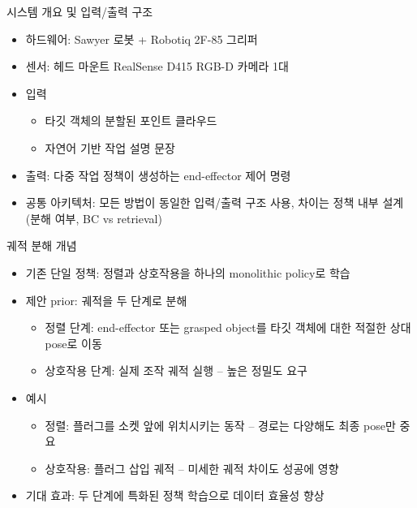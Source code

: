 \documentclass[aspectratio=169]{beamer}
\begin{document}
\begin{frame}{시스템 개요 및 입력/출력 구조}
  \small
  \begin{itemize}
    \item 하드웨어: Sawyer 로봇 + Robotiq 2F-85 그리퍼
    \item 센서: 헤드 마운트 RealSense D415 RGB-D 카메라 1대
    \item 입력
    \begin{itemize}
      \item 타깃 객체의 분할된 포인트 클라우드
      \item 자연어 기반 작업 설명 문장
    \end{itemize}
    \item 출력: 다중 작업 정책이 생성하는 end-effector 제어 명령
    \item 공통 아키텍처: 모든 방법이 동일한 입력/출력 구조 사용, 차이는 정책 내부 설계(분해 여부, BC vs retrieval)
  \end{itemize}
\end{frame}

\begin{frame}{궤적 분해 개념}
  \small
  \begin{itemize}
    \item 기존 단일 정책: 정렬과 상호작용을 하나의 monolithic policy로 학습
    \item 제안 prior: 궤적을 두 단계로 분해
    \begin{itemize}
      \item 정렬 단계: end-effector 또는 grasped object를 타깃 객체에 대한 적절한 상대 pose로 이동
      \item 상호작용 단계: 실제 조작 궤적 실행 – 높은 정밀도 요구
    \end{itemize}
    \item 예시
    \begin{itemize}
      \item 정렬: 플러그를 소켓 앞에 위치시키는 동작 – 경로는 다양해도 최종 pose만 중요
      \item 상호작용: 플러그 삽입 궤적 – 미세한 궤적 차이도 성공에 영향
    \end{itemize}
    \item 기대 효과: 두 단계에 특화된 정책 학습으로 데이터 효율성 향상
  \end{itemize}
\end{frame}
\end{document}
